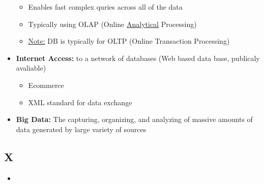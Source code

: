 \documentclass[12pt]{article}
\begin{document}
\begin{itemize}
\begin{itemize}
								\item Enables fast complex quries across all of the data
								\item Typically using OLAP (Online \underline{Analytical} Processing)
								\item \underline{Note:} DB is typically for OLTP (Online Transaction Processing)
					 \end{itemize}
		  \item \textbf{Internet Access:} to a network of databases (Web based data base, publicaly avaliable)
					 \begin{itemize}
								\item Ecommerce
								\item XML standard for data exchange
					 \end{itemize}
		  \item \textbf{Big Data:} The capturing, organizing, and analyzing of massive amounts of data
					 generated by large variety of sources
\end{itemize}

\subsection{X}

\begin{itemize}
		  \item \textbf{}
\end{itemize}
\end{document}
